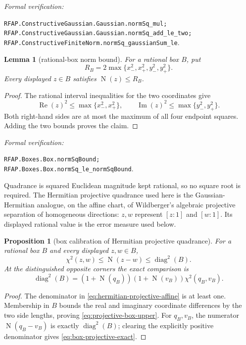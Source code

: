 \documentclass[11pt]{article}
\newtheorem{lemma}[theorem]{Lemma}
\newtheorem{proposition}[theorem]{Proposition}
\newcommand{\Norm}[1]{\operatorname{N}\!\left(#1\right)}
\newcommand{\Ree}{\operatorname{Re}}
\newcommand{\Imm}{\operatorname{Im}}
\newcommand{\diamq}{\operatorname{diag}^{2}}
\newcommand{\leanref}[1]{\par\smallskip\noindent
  \emph{Formal verification:}\par\nobreak
  {\raggedright\nolinkurl{#1}.\par}}
\begin{document}
\leanref{RFAP.ConstructiveGaussian.Gaussian.normSq_mul;
RFAP.ConstructiveGaussian.Gaussian.normSq_add_le_two;
RFAP.ConstructiveFiniteNorm.normSq_gaussianSum_le}

\begin{lemma}[rational-box norm bound]
\label{lem:box-norm-bound}
For a rational box $B$, put
\[
  R_B=2\max\{x_-^2,x_+^2,y_-^2,y_+^2\}.
\]
Every displayed $z\in B$ satisfies $\Norm z\le R_B$.
\end{lemma}

\begin{proof}
The rational interval inequalities for the two coordinates give
\[
 \Ree(z)^2\le\max\{x_-^2,x_+^2\},\qquad
 \Imm(z)^2\le\max\{y_-^2,y_+^2\}.
\]
Both right-hand sides are at most the maximum of all four endpoint squares.
Adding the two bounds proves the claim.
\end{proof}

\leanref{RFAP.Boxes.Box.normSqBound;
RFAP.Boxes.Box.normSq_le_normSqBound}

Quadrance is squared Euclidean magnitude kept rational, so no square root is
required.  The Hermitian projective quadrance used here is the
Gaussian-Hermitian analogue, on the affine chart, of Wildberger's algebraic
projective separation of homogeneous directions: $z,w$ represent $[z:1]$
and $[w:1]$.  Its displayed rational value is the error measure used below.

\begin{proposition}[box calibration of Hermitian projective quadrance]
\label{prop:box-projective-calibration}
For a rational box $B$ and every displayed $z,w\in B$,
\begin{equation}
\label{eq:projective-box-upper}
       \chi^2(z,w)\le\Norm{z-w}\le\diamq(B).
\end{equation}
At the distinguished opposite corners the exact comparison is
\begin{equation}
\label{eq:box-projective-exact}
 \diamq(B)=
 (1+\Norm{q_B})(1+\Norm{v_B})\chi^2(q_B,v_B).
\end{equation}
\end{proposition}

\begin{proof}
The denominator in \cref{eq:hermitian-projective-affine} is at least one.
Membership in $B$ bounds the real and imaginary coordinate differences by the two side
lengths, proving \cref{eq:projective-box-upper}.  For $q_B,v_B$, the numerator
$\Norm{q_B-v_B}$ is exactly $\diamq(B)$; clearing the explicitly positive
denominator gives \cref{eq:box-projective-exact}.
\end{proof}
\end{document}
